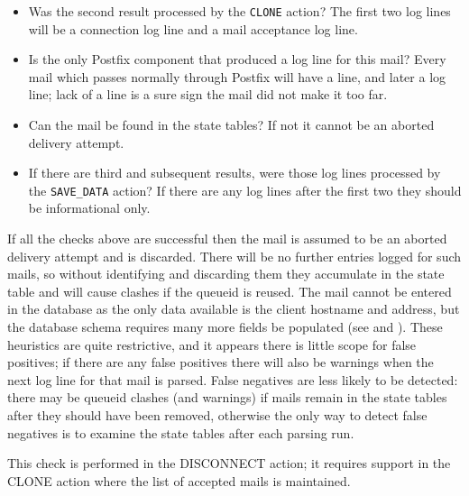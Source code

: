 \begin{itemize}

    \item Was the second result processed by the \texttt{CLONE} action?
        The first two  log lines will be a connection log
        line and a mail acceptance log line.

    \item Is  the only Postfix component that produced a log
        line for this mail?  Every mail which passes normally through
        Postfix will have a  line, and later a
         log line; lack of a  line is a sure
        sign the mail did not make it too far.

    \item Can the mail be found in the state tables?  If not it cannot be
        an aborted delivery attempt.

    \item If there are third and subsequent results, were those log lines
        processed by the \texttt{SAVE\_DATA} action?  If there are any log
        lines after the first two they should be informational only.

\end{itemize}

If all the checks above are successful then the mail is assumed to be an
aborted delivery attempt and is discarded.  There will be no further
entries logged for such mails, so without identifying and discarding them
they accumulate in the state table and will cause clashes if the queueid is
reused.  The mail cannot be entered in the database as the only data
available is the client hostname and  address, but the database
schema requires many more fields be populated (see  and ).  These heuristics are quite
restrictive, and it appears there is little scope for false positives; if
there are any false positives there will also be warnings when the next log
line for that mail is parsed.  False negatives are less likely to be
detected: there may be queueid clashes (and warnings) if mails remain in
the state tables after they should have been removed, otherwise the only
way to detect false negatives is to examine the state tables after each
parsing run.

This check is performed in the DISCONNECT action; it requires support in
the CLONE action where the list of accepted mails is maintained.


